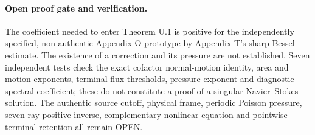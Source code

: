 \paragraph{Open proof gate and verification.}
The coefficient needed to enter Theorem U.1 is positive for the independently specified, non-authentic Appendix O prototype by Appendix T's sharp Bessel estimate. The existence of a correction and its pressure are not established. Seven independent tests check the exact cofactor normal-motion identity, area and motion exponents, terminal flux thresholds, pressure exponent and diagnostic spectral coefficient; these do not constitute a proof of a singular Navier--Stokes solution. The authentic source cutoff, physical frame, periodic Poisson pressure, seven-ray positive inverse, complementary nonlinear equation and pointwise terminal retention all remain OPEN.

